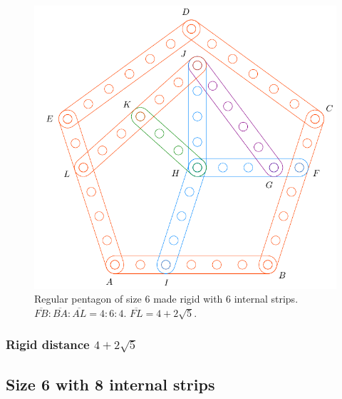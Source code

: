 \documentclass[11pt]{article}
\begin{document}
\begin{figure}[H]
\centering
\includegraphics[scale=0.7]{6/penta6-6a}
\caption{Regular pentagon of size 6 made rigid with 6 internal strips. $\overline{FB} : \overline{BA} : \overline{AL} = 4:6:4$. $\overline{FL} = 4 + 2\sqrt5$.}
\label{fig:penta6-6a}
\end{figure}

\subsubsection{Rigid distance $4 + 2\sqrt5$}

\subsection{Size 6 with 8 internal strips}
\end{document}
